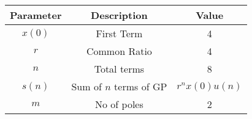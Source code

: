 \begin{tabular}{|c|c|c|}
    \hline
     Parameter & Description & Value \\
    \hline
     $x(0)$ & First Term & 4\\
     \hline
     $r$ & Common Ratio  & 4\\
    \hline
    $n$ & Total terms & 8\\ 
    \hline
    $s(n)$ & Sum of $n$ terms of GP & $r^nx(0)u(n)$\\
    \hline
    $m$ & No of poles & 2\\
    \hline
\end{tabular}